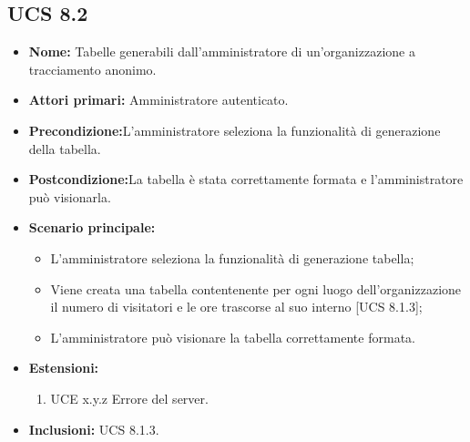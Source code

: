 \subsection{UCS 8.2}%
\begin{itemize}
\item \textbf{Nome:} Tabelle generabili dall'amministratore di un'organizzazione a tracciamento anonimo.
\item \textbf{Attori primari:} Amministratore autenticato.
\item \textbf{Precondizione:}L'amministratore seleziona la funzionalità di generazione della tabella.
\item \textbf{Postcondizione:}La tabella è stata correttamente formata e l'amministratore può visionarla.
\item \textbf{Scenario principale:}
	\begin{itemize}%
	\item L'amministratore seleziona la funzionalità di generazione tabella;
	\item Viene creata una tabella contentenente per ogni luogo dell'organizzazione il numero di visitatori e le ore trascorse al suo interno [UCS 8.1.3];
	\item L'amministratore può visionare la tabella correttamente formata.
\end{itemize}
\item \textbf{Estensioni:}
	\begin{enumerate}
		\item UCE x.y.z Errore del server.
	\end{enumerate}
\item \textbf{Inclusioni:} UCS 8.1.3.
\end{itemize}
